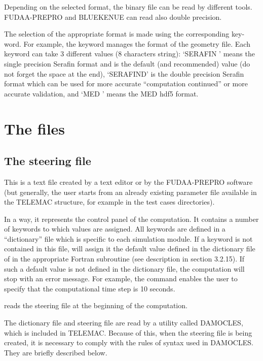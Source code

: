  Depending on the selected format, the binary file can be read by different tools. FUDAA-PREPRO and BLUEKENUE can read also double precision.

 The selection of the appropriate format is made using the corresponding key-word. For example, the keyword manages the format of the geometry file. Each keyword can take 3 different values (8 characters string): `SERAFIN ' means the single precision Serafin format and is the default (and recommended) value (do not forget the space at the end), `SERAFIND' is the double precision Serafin format which can be used for more accurate ``computation continued'' or more accurate validation, and `MED     ' means the MED hdf5 format.


\section{The files}


\subsection{ The steering file}

 This is a text file created by a text editor or by the FUDAA-PREPRO software (but generally, the user starts from an already existing parameter file available in the TELEMAC structure, for example in the test cases directories).

 In a way, it represents the control panel of the computation. It contains a number of keywords to which values are assigned. All keywords are defined in a ``dictionary'' file which is specific to each simulation module. If a keyword is not contained in this file,  will assign it the default value defined in the dictionary file of in the appropriate Fortran subroutine (see description in section 3.2.15). If such a default value is not defined in the dictionary file, the computation will stop with an error message. For example, the command  enables the user to specify that the computational time step is 10 seconds.

  reads the steering file at the beginning of the computation.

 The dictionary file and steering file are read by a utility called DAMOCLES, which is included in TELEMAC. Because of this, when the steering file is being created, it is necessary to comply with the rules of syntax used in DAMOCLES. They are briefly described below.

